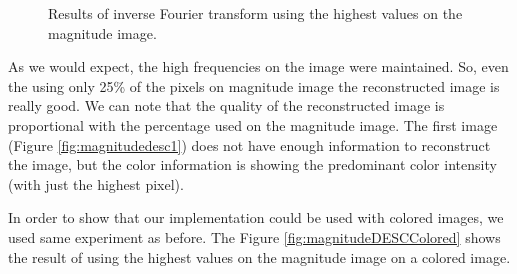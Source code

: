 \documentclass[12pt,a4paper]{article}
\begin{document}
\begin{itemize}
\begin{figure}[!h]
{{			}
			\label{fig:magnitudedesc50}
		}
		\quad
		
		\caption{Results of inverse Fourier transform using the highest values on the magnitude image.}
		\label{fig:magnitudeDESC}
	\end{figure}
	
	As we would expect, the high frequencies on the image were maintained. So, even the using only 25\% of the pixels on magnitude image the reconstructed image is really good. We can note that the quality of the reconstructed image is proportional with the percentage used on the magnitude image. The first image (Figure \ref{fig:magnitudedesc1}) does not have enough information to reconstruct the image, but the color information is showing the predominant color intensity (with just the highest pixel).
	
\end{itemize}

\newpage

In order to show that our implementation could be used with colored images, we used same experiment as before. The Figure \ref{fig:magnitudeDESCColored} shows the result of using the highest values on the magnitude image on a colored image.\\
\end{document}
